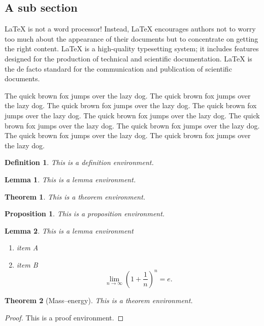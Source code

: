 \documentclass[openany,twoside,12pt]{book}
\theoremstyle{plain}
\newtheorem{definition}{Definition}[chapter]
\newtheorem{proposition}{Proposition}[chapter]
\newtheorem{lemma}{Lemma}[chapter]
\newtheorem{theorem}{Theorem}[chapter]
\numberwithin{equation}{chapter}
\numberwithin{figure}{chapter}
\numberwithin{table}{chapter}
\begin{document}
\subsection{A sub section}
LaTeX is not a word processor! Instead, LaTeX encourages authors not to worry too much about the appearance of their documents but to concentrate on getting the right content. LaTeX is a high-quality typesetting system; it includes features designed for the production of technical and scientific documentation. LaTeX is the de facto standard for the communication and publication of scientific documents.

The quick brown fox jumps over the lazy dog. The quick brown fox jumps over the lazy dog. The quick brown fox jumps over the lazy dog. The quick brown fox jumps over the lazy dog. The quick brown fox jumps over the lazy dog. The quick brown fox jumps over the lazy dog. The quick brown fox jumps over the lazy dog. The quick brown fox jumps over the lazy dog. The quick brown fox jumps over the lazy dog.

\begin{definition}
This is a definition environment.
\end{definition}

\begin{lemma}
This is a lemma environment.
\end{lemma}

\begin{theorem}
This is a theorem environment.
\end{theorem}

\begin{proposition}
This is a proposition environment.
\end{proposition}

\begin{lemma}
This is a lemma environment
\begin{enumerate}[label=\rm (\roman*)]
  \item item A
  \item item B
  \begin{equation}\label{eq:limite}
    \lim_{n\to\infty}\left(1+\frac{1}{n}\right)^n=e.
  \end{equation}
\end{enumerate}
\end{lemma}

\begin{theorem}[Mass--energy]
This is a theorem environment.
\end{theorem}
\begin{proof}
  This is a proof environment.
\end{proof}
\end{document}

